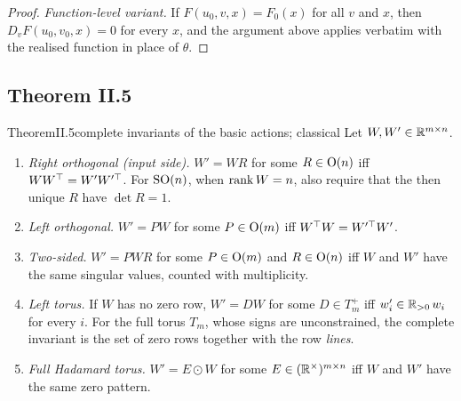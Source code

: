 \begin{proof}
\emph{Function-level variant.} If $F(u_0,v,x)=F_0(x)$ for all $v$ and $x$, then $D_vF(u_0,v_0,x)=0$ for every $x$, and the
argument above applies verbatim with the realised function in place of $\theta$.
\end{proof}

\subsection{Theorem II.5}\label{proof:II.5}

\begin{restate}{Theorem}{II.5}{complete invariants of the basic actions; classical}
Let $W,W'\in\mathbb{R}^{m\times n}$.
\begin{enumerate}[label=(\arabic*)]
  \item \emph{Right orthogonal (input side).} $W'=WR$ for some $R\in\mathrm{O}(n)$ iff $WW^{\top}=W'W'^{\top}$. For $\mathrm{SO}(n)$, when
    $\operatorname{rank} W=n$, also require that the then unique $R$ have $\det R=1$.
  \item \emph{Left orthogonal.} $W'=PW$ for some $P\in\mathrm{O}(m)$ iff $W^{\top} W=W'^{\top}W'$.
  \item \emph{Two-sided.} $W'=PWR$ for some $P\in\mathrm{O}(m)$ and $R\in\mathrm{O}(n)$ iff $W$ and $W'$ have the same singular
    values, counted with multiplicity.
  \item \emph{Left torus.} If $W$ has no zero row, $W'=DW$ for some $D\in T_m^+$ iff $w_i'\in\mathbb{R}_{>0}\,w_i$ for every $i$.
    For the full torus $T_m$, whose signs are unconstrained, the complete invariant is the set of zero rows together with
    the row \emph{lines}.
  \item \emph{Full Hadamard torus.} $W'=E\odot W$ for some $E\in(\mathbb{R}^\times)^{m\times n}$ iff $W$ and $W'$ have the same
    zero pattern.
\end{enumerate}
\end{restate}

